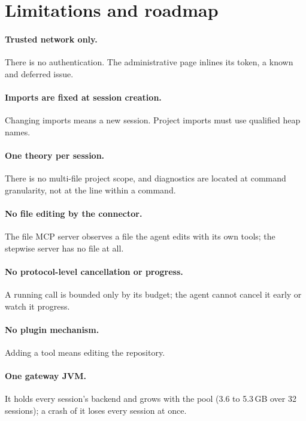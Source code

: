 \documentclass[11pt]{article}
\begin{document}
\section{Limitations and roadmap}
\label{sec:limitations}

\paragraph{Trusted network only.} There is no authentication. The
administrative page inlines its token, a known and deferred issue.

\paragraph{Imports are fixed at session creation.} Changing imports means
a new session. Project imports must use qualified heap names.

\paragraph{One theory per session.} There is no multi-file project scope,
and diagnostics are located at command granularity, not at the line within
a command.

\paragraph{No file editing by the connector.} The file MCP server observes
a file the agent edits with its own tools; the stepwise server has no file
at all.

\paragraph{No protocol-level cancellation or progress.} A running call is
bounded only by its budget; the agent cannot cancel it early or watch it
progress.

\paragraph{No plugin mechanism.} Adding a tool means editing the
repository.

\paragraph{One gateway JVM.} It holds every session's backend and grows
with the pool (3.6 to 5.3\,GB over 32 sessions); a crash of it loses
every session at once.
\end{document}

